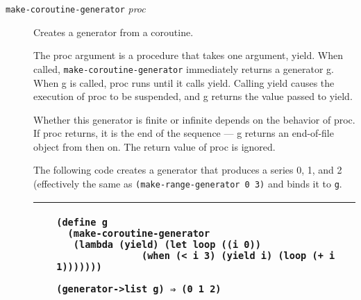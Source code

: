 \begin{description}
\item[\texttt{make-coroutine-generator} \emph{proc}]
Creates a generator from a coroutine.

The proc argument is a procedure that takes one argument, yield. When
called, \texttt{make-coroutine-generator} immediately returns a
generator g. When g is called, proc runs until it calls yield. Calling
yield causes the execution of proc to be suspended, and g returns the
value passed to yield.

Whether this generator is finite or infinite depends on the behavior of
proc. If proc returns, it is the end of the sequence --- g returns an
end-of-file object from then on. The return value of proc is ignored.

The following code creates a generator that produces a series 0, 1, and
2 (effectively the same as \texttt{(make-range-generator\ 0\ 3)} and
binds it to \texttt{g}.

\begin{longtable}[]{@{}ll@{}}
\toprule
\begin{minipage}[t]{0.47\columnwidth}\raggedright\strut
~\strut
\end{minipage} & \begin{minipage}[t]{0.47\columnwidth}\raggedright\strut
\begin{verbatim}
(define g
  (make-coroutine-generator
   (lambda (yield) (let loop ((i 0))
               (when (< i 3) (yield i) (loop (+ i 1)))))))

(generator->list g) ⇒ (0 1 2)
\end{verbatim}
\strut
\end{minipage}\tabularnewline
\bottomrule
\end{longtable}
\end{description}

